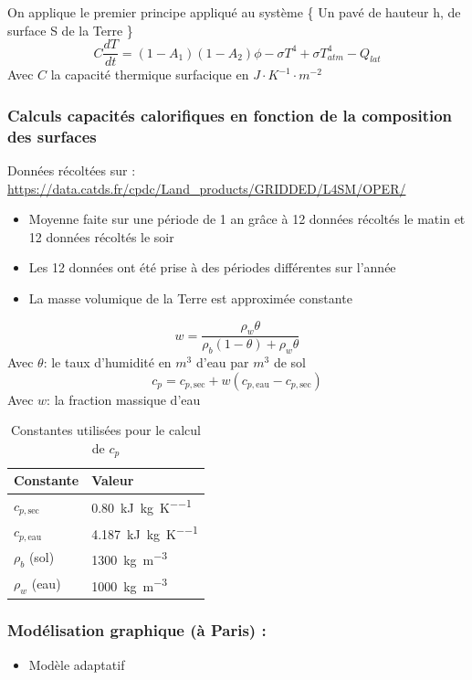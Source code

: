 \documentclass[a4paper,12pt]{article}
\begin{document}
On applique le premier principe appliqué au système \{ Un pavé de hauteur h, de surface S de la Terre \}
\ \ 
\[
C \frac{dT}{dt} =(1-A_1)(1-A_2)\phi-\sigma T^4+\sigma T_{atm}^4-Q_{lat}
\]
Avec \(C\) la capacité thermique surfacique en \(J\cdot K^{-1}\cdot m^{-2}\)

\vspace{0.5cm}
\subsubsection*{Calculs capacités calorifiques en fonction de la composition des surfaces}
Données récoltées sur : 
\url{https://data.catds.fr/cpdc/Land_products/GRIDDED/L4SM/OPER/}

\begin{itemize}
    \item Moyenne faite sur une période de 1 an grâce à 12 données récoltés le matin et 12 données récoltés le soir 
    \item Les 12 données ont été prise à des périodes différentes sur l'année 
    \item La masse volumique de la Terre est approximée constante 
\end{itemize}
\[
w = \frac{\rho_w \theta}{\rho_b (1 - \theta) + \rho_w \theta}
\]
Avec \(\theta\): le taux d'humidité en \(m^3\) d'eau par \(m^3\) de sol 
\[
c_p = c_{p,\text{sec}} + w (c_{p,\text{eau}} - c_{p,\text{sec}})
\]
Avec \(w\): la fraction massique d'eau 
\begin{table}[h!]
\centering
\begin{tabular}{ll}
\textbf{Constante} & \textbf{Valeur} \\
\hline
$c_{p,\text{sec}}$ & \SI{0.80}{\kilo\joule\per\kilogram\per\kelvin} \\
$c_{p,\text{eau}}$ & \SI{4.187}{\kilo\joule\per\kilogram\per\kelvin} \\
$\rho_b$ (sol) & \SI{1300}{\kilogram\per\cubic\metre} \\
$\rho_w$ (eau) & \SI{1000}{\kilogram\per\cubic\metre} \\
\end{tabular}
\caption*{Constantes utilisées pour le calcul de $c_p$}
\vspace{1cm}
\end{table}

\subsubsection*{Modélisation graphique (à Paris) :} 
\begin{itemize}
    \item Modèle adaptatif
\end{itemize}
\end{document}
